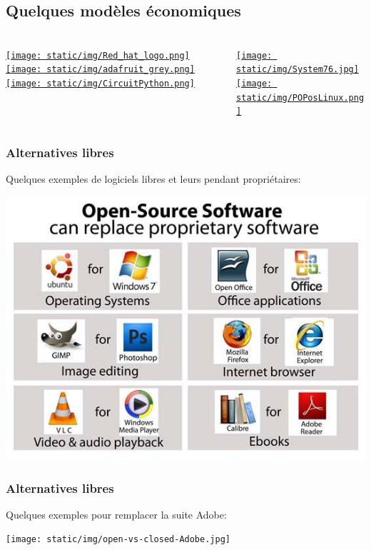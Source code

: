 \documentclass{beamer}
\begin{document}
\subsection{Quelques modèles économiques}
\begin{frame}
	\frametitle{\insertsubsection}
	
	\begin{columns}
		\begin{column}{.5\linewidth}
			\href{https://www.redhat.com/fr}{\texttt{[image: static/img/Red\_hat\_logo.png]}}
			\href{https://www.adafruit.com/}{\texttt{[image: static/img/adafruit\_grey.png]}}
			\href{https://circuitpython.org/}{\texttt{[image: static/img/CircuitPython.png]}}
		\end{column}
	
		\begin{column}{.5\linewidth}
			\href{https://system76.com/}{\texttt{[image: static/img/System76.jpg]}}
			\href{https://pop.system76.com/}{\texttt{[image: static/img/POPosLinux.png]}}
		\end{column}
	\end{columns}
\end{frame}

\begin{frame}
	\frametitle{Alternatives libres}
	
	Quelques exemples de logiciels libres et leurs pendant propriétaires:
	
	\begin{center}
		\includegraphics[width=.7\linewidth]{static/img/alternatives_libres.jpg}
	\end{center}
\end{frame}

\begin{frame}
	\frametitle{Alternatives libres}
	
	Quelques exemples pour remplacer la suite Adobe:
	
	\begin{center}
		\texttt{[image: static/img/open-vs-closed-Adobe.jpg]}
	\end{center}
	
\end{frame}
\end{document}

